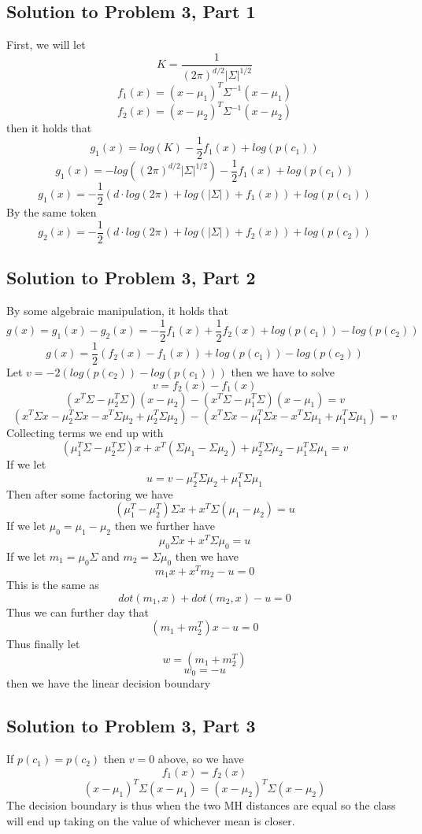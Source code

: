 \documentclass[11pt,psfig]{article}
\begin{document}
\subsection*{Solution to Problem 3, Part 1}
First, we will let
\[
K = \frac{1}{(2\pi)^{d/2}|\Sigma|^{1/2}}
\]
\[
f_1(x) = (x-\mu_1)^T \Sigma^{-1} (x-\mu_1)
\]
\[
f_2(x) = (x-\mu_2)^T \Sigma^{-1} (x-\mu_2)
\]
then it holds that
\[
g_1(x) = log(K) - \frac{1}{2}f_1(x) + log(p(c_1))
\]
\[
g_1(x) = -log((2\pi)^{d/2} |\Sigma|^{1/2}) - \frac{1}{2}f_1(x) + log(p(c_1))
\]
\[
g_1(x) = -\frac{1}{2}( d \cdot log(2\pi) + log(|\Sigma|) + f_1(x)) + log(p(c_1))
\]
By the same token
\[
g_2(x) = -\frac{1}{2}( d \cdot log(2\pi) + log(|\Sigma|) + f_2(x)) + log(p(c_2))
\]

\subsection*{Solution to Problem 3, Part 2}

By some algebraic manipulation, it holds that
\[
g(x) = g_1(x)-g_2(x) = - \frac{1}{2} f_1(x) + \frac{1}{2} f_2(x) + log(p(c_1)) - log(p(c_2))
\]
\[
g(x) = \frac{1}{2} ( f_2(x) - f_1(x) ) + log(p(c_1)) - log(p(c_2))
\]
Let $v = -2( log(p(c_2)) - log(p(c_1)) )$ then we have to solve
\[
v = f_2(x) - f_1(x)
\]
\[
(x^T \Sigma - \mu_2^T \Sigma)(x - \mu_2) - (x^T \Sigma - \mu_1^T \Sigma)(x - \mu_1) = v
\]
\[
(x^T \Sigma x - \mu_2^T \Sigma x - x^T \Sigma \mu_2 + \mu_2^T \Sigma \mu_2) - (x^T \Sigma x - \mu_1^T \Sigma x - x^T \Sigma \mu_1 + \mu_1^T \Sigma \mu_1) = v
\]
Collecting terms we end up with
\[
(\mu_1^T \Sigma - \mu_2^T \Sigma) x + x^T (\Sigma \mu_1 - \Sigma \mu_2) + \mu_2^T \Sigma \mu_2 - \mu_1^T \Sigma \mu_1 = v
\]
If we let
\[
u = v - \mu_2^T \Sigma \mu_2 + \mu_1^T \Sigma \mu_1
\]
Then after some factoring we have
\[
(\mu_1^T - \mu_2^T) \Sigma x + x^T \Sigma (\mu_1 - \mu_2) = u
\]
If we let $\mu_0 = \mu_1 - \mu_2$ then we further have
\[
\mu_0 \Sigma x + x^T \Sigma \mu_0 = u
\]
If we let $m_1 = \mu_0 \Sigma$ and $m_2 = \Sigma \mu_0$ then we have
\[
m_1 x + x^T m_2 - u = 0
\]
This is the same as
\[
dot(m_1,x) + dot(m_2,x) - u = 0
\]
Thus we can further day that
\[
(m_1 + m_2^T)x - u = 0
\]
Thus finally let
\[
w = (m_1 + m_2^T)
\]
\[
w_0 = -u
\]
then we have the linear decision boundary

\subsection*{Solution to Problem 3, Part 3}

If $p(c_1) = p(c_2)$ then $v=0$ above, so we have
\[
f_1(x) = f_2(x)
\]
\[
(x-\mu_1)^T \Sigma (x-\mu_1) = (x-\mu_2)^T \Sigma (x-\mu_2)
\]
The decision boundary is thus when the two MH distances are equal so the class will end up taking on the value of whichever mean is closer. 
\end{document}
